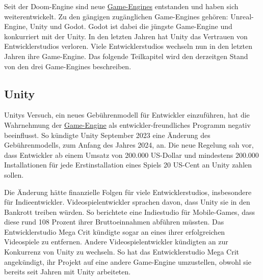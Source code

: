 Seit der Doom-Engine sind neue \hyperref[chap:game engines]{Game-Engines} entstanden und haben sich weiterentwickelt. Zu den g\"{a}ngigen zug\"{a}nglichen Game-Engines geh\"{o}ren: Unreal-Engine, Unity und Godot. Godot ist dabei die j\"{u}ngste Game-Engine und konkurriert mit der Unity. In den letzten Jahren hat Unity das Vertrauen von Entwicklerstudios verloren. Viele Entwicklerstudios wechseln nun in den letzten Jahren ihre Game-Engine. Das folgende Teilkapitel wird den derzeitgen Stand von den drei Game-Engines beschreiben.  


\subsection{Unity}
\label{chap:sota unity}

Unitys Versuch, ein neues Geb\"{u}hrenmodell f\"{u}r Entwickler einzuf\"{u}hren, hat die Wahrnehmung der \hyperref[chap:game engines]{Game-Engine} als entwickler-freundliches Programm negativ beeinflusst. So k\"{u}ndigte Unity September 2023 eine \"{A}nderung des Geb\"{u}hrenmodells, zum Anfang des Jahres 2024, an. Die neue Regelung sah vor, dass Entwickler ab einem Umsatz von 200.000 US-Dollar und mindestens 200.000 Installationen f\"{u}r jede Erstinstallation eines Spiels 20 US-Cent an Unity zahlen sollen.\autocite{golem1}

Die \"{A}nderung h\"{a}tte finanzielle Folgen f\"{u}r viele Entwicklerstudios, insbesondere f\"{u}r Indieentwickler. Videospielentwickler sprachen davon, dass Unity sie in den Bankrott treiben w\"{u}rden. So berichtete eine Indiestudio f\"{u}r Mobile-Games, dass diese rund 108 Prozent ihrer Bruttoeinnahmen abf\"{u}hren m\"{u}ssten. Das Entwicklerstudio Mega Crit k\"{u}ndigte sogar an eines ihrer erfolgreichen Videospiele zu entfernen. Andere Videospielentwickler k\"{u}ndigten an zur Konkurrenz von Unity zu wechseln. So hat das Entwicklerstudio Mega Crit angek\"{u}ndigt, ihr Projekt auf eine andere Game-Engine umzustellen, obwohl sie bereits seit Jahren mit Unity arbeiteten.\autocite{golem1} 

